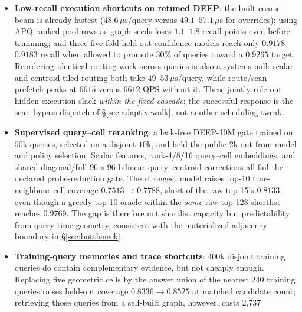 \documentclass{article}
\begin{document}
\begin{itemize}
    graph/rescore floor: paired end-to-end ABBA gives $0.9010$@$3508$ QPS versus
    $0.9012$@$3488$ for the scan path (a $0.6\%$ tie), and a slightly wider walk
    is $0.7\%$ slower for $+0.0016$ recall. Thus portals are not a frontier
    \emph{candidate-pool replacement}; \S\ref{sec:adaptivewalk} later succeeds
    by using only their bucket identity to select point-walk entries and
    eliminating the scan/union path entirely.
  \item \textbf{Low-recall execution shortcuts on retuned DEEP}: the built
    coarse beam is already fastest ($48.6\,\mu$s/query versus
    $49.1$--$57.1\,\mu$s for overrides); using APQ-ranked pool rows as graph
    seeds loses $1.1$--$1.8$ recall points even before trimming; and three
    five-fold held-out confidence models reach only $0.9178$--$0.9183$ recall
    when allowed to promote $30\%$ of queries toward a $0.9265$ target.
    Reordering identical routing work across queries is also a systems null:
    scalar and centroid-tiled routing both take $49$--$53\,\mu$s/query, while
    route/scan prefetch peaks at $6615$ versus $6612$ QPS without it. These
    jointly rule out hidden execution slack \emph{within the fixed cascade};
    the successful response is the scan-bypass dispatch of
    \S\ref{sec:adaptivewalk}, not another scheduling tweak.
  \item \textbf{Supervised query--cell reranking}: a leak-free DEEP-10M gate
    trained on $50$k queries, selected on a disjoint $10$k, and held the
    public $2$k out from model and policy selection. Scalar features, rank-4/8/16 query--cell embeddings,
    and shared diagonal/full $96{\times}96$ bilinear query--centroid corrections
    all fail the declared probe-reduction gate. The strongest model raises
    top-10 true-neighbour cell coverage $0.7513\to0.7788$, short of the raw
    top-15's $0.8133$, even though a greedy top-10 oracle within the \emph{same}
    raw top-128 shortlist reaches $0.9769$. The gap is therefore not shortlist
    capacity but predictability from query-time geometry, consistent with the
    materialized-adjacency boundary in \S\ref{sec:bottleneck}.
  \item \textbf{Training-query memories and trace shortcuts}: 400k disjoint
    training queries do contain complementary evidence, but not cheaply enough.
    Replacing five geometric cells by the answer union of the nearest 240 training
    queries raises held-out coverage $0.8336\to0.8525$ at matched candidate count;
    retrieving those queries from a self-built graph, however, costs 2,737

\end{itemize}
\end{document}

